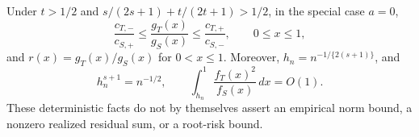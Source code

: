 Under \(t>1/2\) and \(s/(2s+1)+t/(2t+1)>1/2\), in the special case \(a=0\),
\[
\frac{c_{T,-}}{c_{S,+}}
\le \frac{g_T(x)}{g_S(x)}
\le \frac{c_{T,+}}{c_{S,-}},
\qquad 0\le x\le1,
\]
and \(r(x)=g_T(x)/g_S(x)\) for \(0<x\le1\). Moreover, \(h_n=n^{-1/\{2(s+1)\}}\), and
\[
h_n^{s+1}=n^{-1/2},\qquad
\int_{h_n}^1\frac{f_T(x)^2}{f_S(x)}\,dx=O(1).
\]
These deterministic facts do not by themselves assert an empirical norm bound, a nonzero realized residual sum, or a root-risk bound.